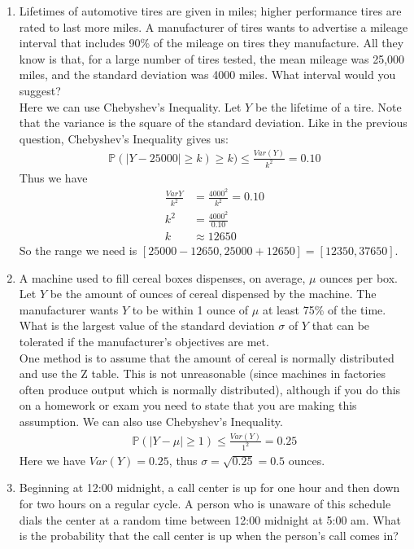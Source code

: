 \documentclass[12pt]{article}
\def\P{{\mathbb P}}
\begin{document}
\begin{enumerate}
\item Lifetimes of automotive tires are given in miles; higher performance tires are rated to last more miles. A manufacturer of tires wants to advertise a mileage interval that includes 90\% of the mileage on tires they manufacture. All they know is that, for a large number of tires tested, the mean mileage was 25,000 miles, and the standard deviation was 4000 miles. What interval would you suggest?\\

Here we can use Chebyshev's Inequality. Let $Y$ be the lifetime of a tire. Note that the variance is the square of the standard deviation. Like in the previous question, Chebyshev's Inequality gives us:
\begin{align*}
\P( |Y - 25000| \geq k) \geq k) \leq \frac{Var(Y)}{k^2} = 0.10
\end{align*}
Thus we have
\begin{align*}
\frac{Var{Y}}{k^2} &= \frac{4000^2}{k^2} = 0.10\\
k^2 &= \frac{4000^2}{0.10}\\
k &\approx 12650
\end{align*}
So the range we need is $[25000 - 12650, 25000 + 12650] = [12350, 37650]$.

\item A machine used to fill cereal boxes dispenses, on average, $\mu$ ounces per box. Let $Y$ be the amount of ounces of cereal dispensed by the machine. The manufacturer wants $Y$ to be within 1 ounce of $\mu$ at least 75\% of the time. What is the largest value of the standard deviation $\sigma$ of $Y$ that can be tolerated if the manufacturer's objectives are met.\\

One method is to assume that the amount of cereal is normally distributed and use the Z table. This is not unreasonable (since machines in factories often produce output which is normally distributed), although if you do this on a homework or exam you need to state that you are making this assumption. We can also use Chebyshev's Inequality.
\begin{align*}
\P(|Y - \mu| \geq 1) \leq \frac{Var(Y)}{1^2} = 0.25
\end{align*}
Here we have $Var(Y) = 0.25$, thus $\sigma = \sqrt{0.25} = 0.5$ ounces.

\item Beginning at 12:00 midnight, a call center is up for one hour and then down for two hours on a regular cycle. A person who is unaware of this schedule dials the center at a random time between 12:00 midnight at 5:00 am. What is the probability that the call center is up when the person's call comes in?\\


\end{enumerate}
\end{document}

